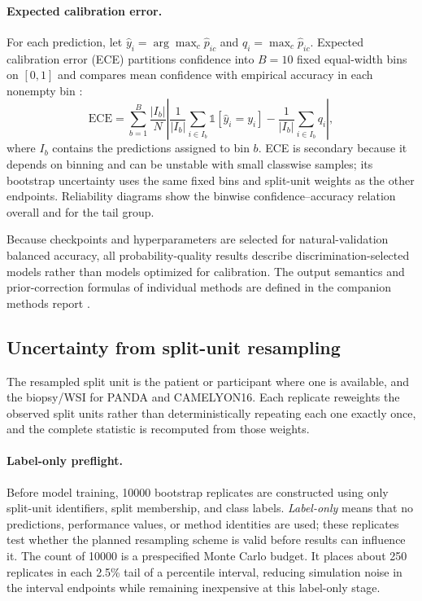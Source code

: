 \documentclass[11pt]{article}
\begin{document}
\paragraph{Expected calibration error.}
For each prediction, let $\hat{y}_i=\arg\max_c\hat{p}_{ic}$ and $q_i=\max_c\hat{p}_{ic}$. Expected calibration error (ECE) partitions confidence into $B=10$ fixed equal-width bins on $[0,1]$ and compares mean confidence with empirical accuracy in each nonempty bin \citep{naeini2015obtaining}:
\begin{equation}
  \mathrm{ECE}=\sum_{b=1}^{B}\frac{|I_b|}{N}
  \left|\frac{1}{|I_b|}\sum_{i\in I_b}\mathbb{1}[\hat{y}_i=y_i]
  -\frac{1}{|I_b|}\sum_{i\in I_b}q_i\right|,
  \label{eq:ece}
\end{equation}
\noindent where $I_b$ contains the predictions assigned to bin $b$. ECE is secondary because it depends on binning and can be unstable with small classwise samples; its bootstrap uncertainty uses the same fixed bins and split-unit weights as the other endpoints. Reliability diagrams show the binwise confidence--accuracy relation overall and for the tail group.

Because checkpoints and hyperparameters are selected for natural-validation balanced accuracy, all probability-quality results describe discrimination-selected models rather than models optimized for calibration. The output semantics and prior-correction formulas of individual methods are defined in the companion methods report \citep{queisler2026imbalanceMethods}.

\subsection{Uncertainty from split-unit resampling}
The resampled split unit is the patient or participant where one is available, and the biopsy/WSI for PANDA and CAMELYON16. Each replicate reweights the observed split units rather than deterministically repeating each one exactly once, and the complete statistic is recomputed from those weights.

\paragraph{Label-only preflight.}
Before model training, \num{10000} bootstrap replicates are constructed using only split-unit identifiers, split membership, and class labels. \emph{Label-only} means that no predictions, performance values, or method identities are used; these replicates test whether the planned resampling scheme is valid before results can influence it. The count of \num{10000} is a prespecified Monte Carlo budget. It places about 250 replicates in each 2.5\% tail of a percentile interval, reducing simulation noise in the interval endpoints while remaining inexpensive at this label-only stage.
\end{document}
